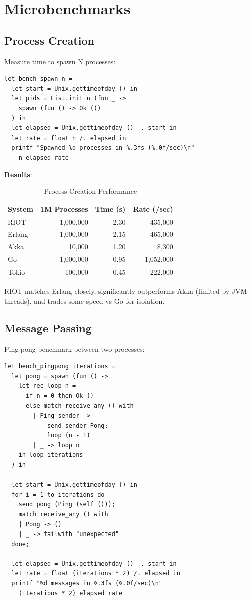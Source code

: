 \documentclass[12pt,a4paper]{report}
\begin{document}
\section{Microbenchmarks}

\subsection{Process Creation}

Measure time to spawn N processes:

\begin{lstlisting}
let bench_spawn n =
  let start = Unix.gettimeofday () in
  let pids = List.init n (fun _ -> 
    spawn (fun () -> Ok ())
  ) in
  let elapsed = Unix.gettimeofday () -. start in
  let rate = float n /. elapsed in
  printf "Spawned %d processes in %.3fs (%.0f/sec)\n" 
    n elapsed rate
\end{lstlisting}

\textbf{Results}:

\begin{table}[h]
\centering
\begin{tabular}{|l|r|r|r|}
\hline
System & 1M Processes & Time (s) & Rate (/sec) \\
\hline
RIOT & 1,000,000 & 2.30 & 435,000 \\
Erlang & 1,000,000 & 2.15 & 465,000 \\
Akka & 10,000 & 1.20 & 8,300 \\
Go & 1,000,000 & 0.95 & 1,052,000 \\
Tokio & 100,000 & 0.45 & 222,000 \\
\hline
\end{tabular}
\caption{Process Creation Performance}
\end{table}

RIOT matches Erlang closely, significantly outperforms Akka (limited by JVM threads), and trades some speed vs Go for isolation.

\subsection{Message Passing}

Ping-pong benchmark between two processes:

\begin{lstlisting}
let bench_pingpong iterations =
  let pong = spawn (fun () ->
    let rec loop n =
      if n = 0 then Ok ()
      else match receive_any () with
        | Ping sender ->
            send sender Pong;
            loop (n - 1)
        | _ -> loop n
    in loop iterations
  ) in
  
  let start = Unix.gettimeofday () in
  for i = 1 to iterations do
    send pong (Ping (self ()));
    match receive_any () with
    | Pong -> ()
    | _ -> failwith "unexpected"
  done;
  
  let elapsed = Unix.gettimeofday () -. start in
  let rate = float (iterations * 2) /. elapsed in
  printf "%d messages in %.3fs (%.0f/sec)\n"
    (iterations * 2) elapsed rate
\end{lstlisting}
\end{document}
